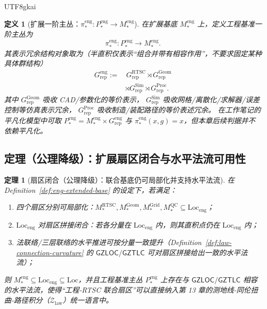\documentclass[12pt]{article}
\newtheorem{definition}{定义}[section]
\newtheorem{theorem}{定理}[section]
\newcommand{\GZLOC}{\ensuremath{\mathsf{GZLOC}}}
\newcommand{\GZTLC}{\ensuremath{\mathsf{GZTLC}}}
\begin{document}
\begin{CJK*}{UTF8}{gkai}
\begin{definition}[扩展一阶主丛：$\pi_\ast^{\mathrm{eng}}:P_\ast^{\mathrm{eng}}\to M_\ast^{\mathrm{eng}}$]
\label{def:eng-extended-benchmark-bundle}
在扩展基底 $M_\ast^{\mathrm{eng}}$ 上，定义工程基准一阶主丛为
\[
\pi_\ast^{\mathrm{eng}}:P_\ast^{\mathrm{eng}}\to M_\ast^{\mathrm{eng}}.
\]
其表示冗余结构对象取为（半直积仅表示“组合并带有相容作用”，不要求固定某种具体群结构）
\[
\begin{aligned}
G_{\mathrm{rep}}^{\mathrm{eng}}
:=
&\,G_{\mathrm{rep}}^{\mathrm{RTSC}}
\rtimes
G_{\mathrm{rep}}^{\mathrm{Geom}}
\\
&\rtimes
G_{\mathrm{rep}}^{\mathrm{Sim}}
\rtimes
G_{\mathrm{rep}}^{\mathrm{Proc}}.
\end{aligned}
\]
其中 $G_{\mathrm{rep}}^{\mathrm{Geom}}$ 吸收 CAD/参数化的等价表示，
$G_{\mathrm{rep}}^{\mathrm{Sim}}$ 吸收网格/离散化/求解器/误差控制等仿真表示冗余，
$G_{\mathrm{rep}}^{\mathrm{Proc}}$ 吸收制造/装配路径的等价表述冗余。
在工作笔记的平凡化模型中可取 $P_\ast^{\mathrm{eng}}=M_\ast^{\mathrm{eng}}\times G_{\mathrm{rep}}^{\mathrm{eng}}$ 与
  $\pi_\ast^{\mathrm{eng}}(x,g)=x$，但本章后续判据并不依赖平凡化。
\end{definition}

\subsection{定理（公理降级）：扩展扇区闭合与水平法流可用性}

\begin{theorem}[扇区闭合（公理降级）：联合基底仍可局部化并支持水平法流]
\label{thm:eng-sector-closure}
在 Definition~\ref{def:eng-extended-base} 的设定下，若满足：
\begin{enumerate}
  \item 四个扇区分别可局部化：$M_\ast^{\mathrm{RTSC}},M_\ast^{\mathrm{Geom}},M_\ast^{\mathrm{Grid}},M_\ast^{\mathrm{QC}}\subseteq
    \mathrm{Loc}_{\mathrm{eng}}$；
  \item $\mathrm{Loc}_{\mathrm{eng}}$ 对扇区拼接闭合：若各分量在 $\mathrm{Loc}_{\mathrm{eng}}$ 内，则其直积点仍在 $\mathrm{Loc}_{\mathrm{eng}}
    $ 内；
  \item 法联络/三层联络的水平推进可按分量一致提升（Definition~\ref{def:law-connection-curvature} 的 $\GZLOC/\GZTLC$ 可对扇区拼接给出一致的水平法流）；
\end{enumerate}
则 $M_\ast^{\mathrm{eng}}\subseteq \mathrm{Loc}_{\mathrm{eng}}\subseteq \mathrm{Loc}$，并且工程基准主丛 $P_\ast^{\mathrm{eng}}$
  上存在与 $\GZLOC/\GZTLC$ 相容的水平法流，使得“工程‑RTSC 联合扇区”可以直接纳入第 13 章的测地线‑同伦扭曲‑路径积分（$\mathcal{Z}_{\mathrm{law}}$）统一语言中。
\end{theorem}


\end{CJK*}
\end{document}
